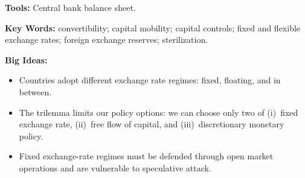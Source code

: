 \textbf{Tools:} Central bank balance sheet.

\textbf{Key Words:} convertibility; capital mobility; capital controls; fixed and flexible exchange rates;
foreign exchange reserves; sterilization.

\textbf{Big Ideas:}
\begin{itemize}
\item Countries adopt different exchange rate regimes: fixed, floating, and in between.
\item The trilemma limits our policy options:  we can choose only two of
(i)~fixed exchange rate, (ii)~free flow of capital,
and (iii)~discretionary monetary policy.
\item Fixed exchange-rate regimes must be defended through open market operations
and are vulnerable to speculative attack.
\end{itemize}
